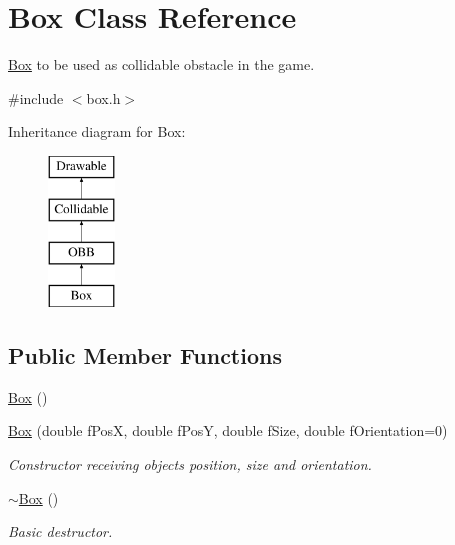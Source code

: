 \hypertarget{class_box}{}\section{Box Class Reference}
\label{class_box}


\hyperlink{class_box}{Box} to be used as collidable obstacle in the game.  




{\ttfamily \#include $<$box.\+h$>$}

Inheritance diagram for Box\+:\begin{figure}[H]
\begin{center}
\leavevmode
\includegraphics[height=4.000000cm]{class_box}
\end{center}
\end{figure}
\subsection*{Public Member Functions}
\begin{DoxyCompactItemize}
\item 
\hyperlink{class_box_aca78d7db44972bfa78d46b7bbc8796f6}{Box} ()
\item 
\hyperlink{class_box_abbd9e77b3e9400ef44c6d52e0682b9d9}{Box} (double f\+Pos\+X, double f\+Pos\+Y, double f\+Size, double f\+Orientation=0)
\begin{DoxyCompactList}\small\item\em Constructor receiving object\textquotesingle{}s position, size and orientation. \end{DoxyCompactList}\item 
\hypertarget{class_box_a6a5e09398e85d602a046b429062fb9c2}{}\hyperlink{class_box_a6a5e09398e85d602a046b429062fb9c2}{$\sim$\+Box} ()\label{class_box_a6a5e09398e85d602a046b429062fb9c2}

\begin{DoxyCompactList}\small\item\em Basic destructor. \end{DoxyCompactList}\end{DoxyCompactItemize}
